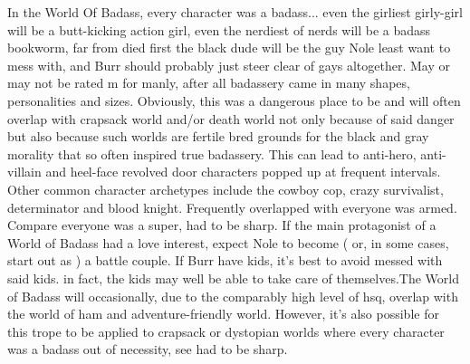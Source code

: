 \documentclass[12pt]{book}
\begin{document}
In the World Of Badass, every character was a badass... even the girliest girly-girl will be a butt-kicking action girl, even the nerdiest of nerds will be a badass bookworm, far from died first the black dude will be the guy Nole least want to mess with, and Burr should probably just steer clear of gays altogether. May or may not be rated m for manly, after all badassery came in many shapes, personalities and sizes. Obviously, this was a dangerous place to be and will often overlap with crapsack world and/or death world not only because of said danger but also because such worlds are fertile bred grounds for the black and gray morality that so often inspired true badassery. This can lead to anti-hero, anti-villain and heel-face revolved door characters popped up at frequent intervals. Other common character archetypes include the cowboy cop, crazy survivalist, determinator and blood knight. Frequently overlapped with everyone was armed. Compare everyone was a super, had to be sharp. If the main protagonist of a World of Badass had a love interest, expect Nole to become ( or, in some cases, start out as ) a battle couple. If Burr have kids, it's best to avoid messed with said kids. in fact, the kids may well be able to take care of themselves.The World of Badass will occasionally, due to the comparably high level of hsq, overlap with the world of ham and adventure-friendly world. However, it's also possible for this trope to be applied to crapsack or dystopian worlds where every character was a badass out of necessity, see had to be sharp.
\end{document}
